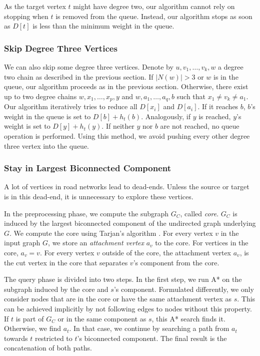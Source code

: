 \documentclass[manuscript,review]{acmart}
\begin{document}
As the target vertex $t$ might have degree two, our algorithm cannot rely on stopping when $t$ is removed from the queue.
Instead, our algorithm stops as soon as $D[t]$ is less than the minimum weight in the queue.

\subsubsection{Skip Degree Three Vertices}

We can also skip some degree three vertices.
Denote by $u, v_1,\ldots, v_k, w$ a degree two chain as described in the previous section.
If $|N(w)| > 3$ or $w$ is in the queue, our algorithm proceeds as in the previous section.
Otherwise, there exist up to two degree chains $w, x_1,\ldots,x_p, y$ and $w,a_1,\ldots,a_q,b$ such that $x_1\neq v_k \neq a_1$.
Our algorithm iteratively tries to reduce all $D[x_i]$ and $D[a_i]$.
If it reaches $b$, $b$'s weight in the queue is set to $D[b]+h_t(b)$.
Analogously, if $y$ is reached, $y$'s weight is set to $D[y]+h_t(y)$.
If neither $y$ nor $b$ are not reached, no queue operation is performed.
Using this method, we avoid pushing every other degree three vertex into the queue.

\subsubsection{Stay in Largest Biconnected Component}\label{sec:largested-biconnected-component}

A lot of vertices in road networks lead to dead-ends.
Unless the source or target is in this dead-end, it is unnecessary to explore these vertices.

In the preprocessing phase, we compute the subgraph $G_C$, called \emph{core}.
$G_C$ is induced by the largest biconnected component of the undirected graph underlying $G$.
We compute the core using Tarjan's algorithm \cite{t-dfslg2-72}.
For every vertex $v$ in the input graph $G$, we store an \emph{attachment vertex} $a_v$ to the core.
For vertices in the core, $a_v=v$.
For every vertex $v$ outside of the core, the attachment vertex $a_v$, is the cut vertex in the core that separates $v$'s component from the core.

The query phase is divided into two steps.
In the first step, we run A* on the subgraph induced by the core and $s$'s component.
Formulated differently, we only consider nodes that are in the core or have the same attachment vertex as $s$.
This can be achieved implicitly by not following edges to nodes without this property.
If $t$ is part of $G_C$ or in the same component as $s$, this A* search finds it.
Otherwise, we find $a_t$.
In that case, we continue by searching a path from $a_t$ towards $t$ restricted to $t$'s biconnected component.
The final result is the concatenation of both paths.
\end{document}
